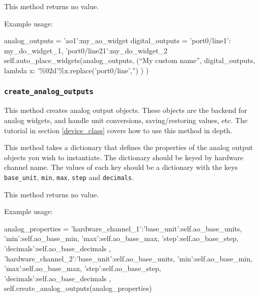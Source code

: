 \documentclass[12pt]{article}
\begin{document}
This method returns no value.

Example usage:
\begin{python}
analog_outputs = {'ao1':my_ao_widget}
digital_outputs = {'port0/line1': my_do_widget_1, 'port0/line21':my_do_widget_2}
self.auto_place_widgets(analog_outputs, 
                        (``My custom name'', digital_outputs, 
                          lambda x: '\%02d'\%x.replace('port0/line','')
                        )
                       )
\end{python}

\subsubsection{\texttt{create\_analog\_outputs}}\label{ref:create_analog_outputs}
This method creates analog output objects. 
These objects are the backend for analog widgets, and handle unit conversions,  saving/restoring values, etc.
The tutorial in section \ref{device_class} covers how to use this method in depth.

This method takes a dictionary that defines the properties of the analog output objects you wish to instantiate. 
The dictionary should be keyed by hardware channel name.
The values of each key should be a dictionary with the keys \texttt{base\_unit}, \texttt{min}, \texttt{max}, \texttt{step} and \texttt{decimals}.

This method returns no value.

Example usage:
\begin{python}
    analog_properties = {'hardware_channel_1':{'base_unit':self.ao_base_units,
                                               'min':self.ao_base_min,
                                               'max':self.ao_base_max,
                                               'step':self.ao_base_step,
                                               'decimals':self.ao_base_decimals
                                              },
                         'hardware_channel_2':{'base_unit':self.ao_base_units,
                                               'min':self.ao_base_min,
                                               'max':self.ao_base_max,
                                               'step':self.ao_base_step,
                                               'decimals':self.ao_base_decimals
                                              },
                        }
    self.create_analog_outputs(analog_properties)
\end{python}
\end{document}

